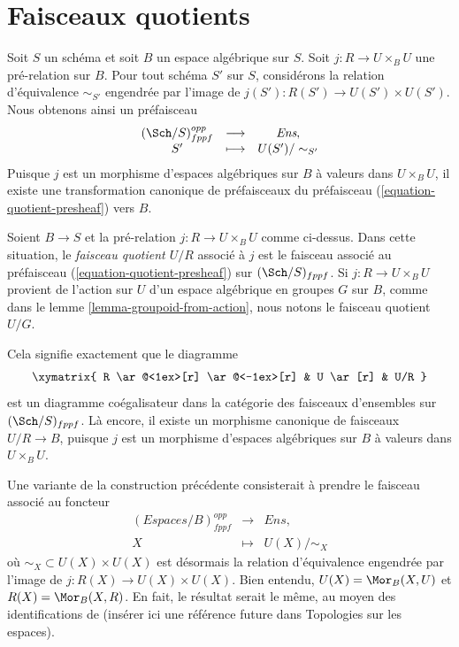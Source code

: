\section{Faisceaux quotients}
\label{section-quotient-sheaves}

\noindent
Soit $S$ un schéma et soit $B$ un espace algébrique sur $S$. Soit $j : R \to U \times_B U$ une pré-relation sur $B$. Pour tout schéma $S'$ sur $S$, considérons la relation d'équivalence $\sim_{S'}$ engendrée par l'image de $j(S') : R(S') \to U(S') \times U(S')$. Nous obtenons ainsi un préfaisceau
\begin{equation}
\label{equation-quotient-presheaf}
\begin{matrix}
(\Sch/S)^{opp}_{fppf} &
\longrightarrow &
\textit{Ens}, \\
S' &
\longmapsto  &
U(S')/\sim_{S'}
\end{matrix}
\end{equation}
Puisque $j$ est un morphisme d'espaces algébriques sur $B$ à valeurs dans $U \times_B U$, il existe une transformation canonique de préfaisceaux du préfaisceau (\ref{equation-quotient-presheaf}) vers $B$.

\begin{definition}
\label{definition-quotient-sheaf}
Soient $B \to S$ et la pré-relation $j : R \to U \times_B U$ comme ci-dessus. Dans cette situation, le {\it faisceau quotient $U/R$} associé à $j$ est le faisceau associé au préfaisceau (\ref{equation-quotient-presheaf}) sur $(\Sch/S)_{fppf}$. Si $j : R \to U \times_B U$ provient de l'action sur $U$ d'un espace algébrique en groupes $G$ sur $B$, comme dans le lemme \ref{lemma-groupoid-from-action}, nous notons le faisceau quotient $U/G$.
\end{definition}

\noindent
Cela signifie exactement que le diagramme
$$
\xymatrix{
R \ar@<1ex>[r] \ar@<-1ex>[r] &
U \ar[r] &
U/R
}
$$
est un diagramme coégalisateur dans la catégorie des faisceaux d'ensembles sur $(\Sch/S)_{fppf}$. Là encore, il existe un morphisme canonique de faisceaux $U/R \to B$, puisque $j$ est un morphisme d'espaces algébriques sur $B$ à valeurs dans $U \times_B U$.

\begin{remark}
\label{remark-quotient-variant}
Une variante de la construction précédente consisterait à prendre le faisceau associé au foncteur
$$
\begin{matrix}
(\textit{Espaces}/B)^{opp}_{fppf} &
\longrightarrow &
\textit{Ens}, \\
X &
\longmapsto  &
U(X)/\sim_X
\end{matrix}
$$
où $\sim_X \subset U(X) \times U(X)$ est désormais la relation d'équivalence engendrée par l'image de $j : R(X) \to U(X) \times U(X)$. Bien entendu, $U(X) = \Mor_B(X, U)$ et $R(X) = \Mor_B(X, R)$. En fait, le résultat serait le même, au moyen des identifications de (insérer ici une référence future dans Topologies sur les espaces).
\end{remark}

